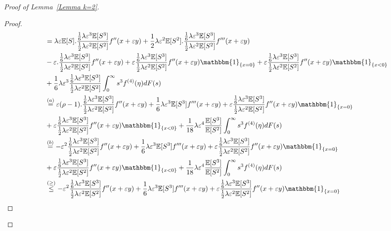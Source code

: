 \documentclass[10pt,a4paper]{amsart}
\begin{document}
\begin{proof}[Proof of Lemma~\ref{Lemma k=2}]
\begin{proof}
\begin{align*}
  &=\lambda \varepsilon \mathbb E[S].\frac{\frac{1}{6}\lambda \varepsilon^3 \mathbb E[S^3]}{\frac{1}{2}\lambda \varepsilon^2 \mathbb E[S^2]}f''(x+\varepsilon y)+\frac{1}{2}\lambda \varepsilon^2 \mathbb E[S^2].\frac{\frac{1}{6}\lambda \varepsilon^3 \mathbb E[S^3]}{\frac{1}{2}\lambda \varepsilon^2 \mathbb E[S^2]}f'''(x+\varepsilon y)\\
    &-\varepsilon.\frac{\frac{1}{6}\lambda \varepsilon^3 \mathbb E[S^3]}{\frac{1}{2}\lambda \varepsilon^2 \mathbb E[S^2]} f''(x+\varepsilon y)+\varepsilon \frac{\frac{1}{6}\lambda \varepsilon^3 \mathbb E[S^3]}{\frac{1}{2}\lambda \varepsilon^2 \mathbb E[S^2]}f''(x+\varepsilon y)\mathbbm{1}_{\{x=0\}}+\varepsilon \frac{\frac{1}{6}\lambda \varepsilon^3 \mathbb E[S^3]}{\frac{1}{2}\lambda \varepsilon^2 \mathbb E[S^2]}f''(x+\varepsilon y)\mathbbm{1}_{\{x<0\}}\\
    &+\frac{1}{6} \lambda \varepsilon^3 \frac{\frac{1}{6}\lambda \varepsilon^3 \mathbb E[S^3]}{\frac{1}{2}\lambda \varepsilon^2 \mathbb E[S^2]} \int_0^\infty s^3 f^{(4)}(\eta )dF(s)\\
    &\stackrel{(a)}{=}\varepsilon(\rho-1 ).\frac{\frac{1}{6}\lambda \varepsilon^3 \mathbb E[S^3]}{\frac{1}{2}\lambda \varepsilon^2 \mathbb E[S^2]}f''(x+\varepsilon y)+\frac{1}{6}\lambda \varepsilon^3 \mathbb E[S^3]f'''(x+\varepsilon y)+\varepsilon \frac{\frac{1}{6}\lambda \varepsilon^3 \mathbb E[S^3]}{\frac{1}{2}\lambda \varepsilon^2 \mathbb E[S^2]}  f''(x+\varepsilon y)\mathbbm{1}_{\{x=0\}}\\
    &+\varepsilon \frac{\frac{1}{6}\lambda \varepsilon^3 \mathbb E[S^3]}{\frac{1}{2}\lambda \varepsilon^2 \mathbb E[S^2]}  f''(x+\varepsilon y)\mathbbm{1}_{\{x<0\}}+\frac{1}{18} \lambda \varepsilon^4 \frac{\mathbb E[S^3]}{\mathbb E[S^2]}\int_0^\infty s^3 f^{(4)}(\eta )dF(s)\\
    &\stackrel{(b)}{=}-\varepsilon^2\frac{\frac{1}{6}\lambda \varepsilon^3 \mathbb E[S^3]}{\frac{1}{2}\lambda \varepsilon^2 \mathbb E[S^2]}f''(x+\varepsilon y)+\frac{1}{6}\lambda \varepsilon^3 \mathbb E[S^3]f'''(x+\varepsilon y)+\varepsilon \frac{\frac{1}{6}\lambda \varepsilon^3 \mathbb E[S^3]}{\frac{1}{2}\lambda \varepsilon^2 \mathbb E[S^2]} f''(x+\varepsilon y)\mathbbm{1}_{\{x=0\}}\\
    &+\varepsilon \frac{\frac{1}{6}\lambda \varepsilon^3 \mathbb E[S^3]}{\frac{1}{2}\lambda \varepsilon^2 \mathbb E[S^2]} f''(x+\varepsilon y)\mathbbm{1}_{\{x<0\}}+\frac{1}{18} \lambda \varepsilon^4 \frac{\mathbb E[S^3]}{\mathbb E[S^2]}\int_0^\infty s^3 f^{(4)}(\eta )dF(s)\\
   &\stackrel{(\geq)} {\leq} -\varepsilon^2\frac{\frac{1}{6}\lambda \varepsilon^3 \mathbb E[S^3]}{\frac{1}{2}\lambda \varepsilon^2 \mathbb E[S^2]}f''(x+\varepsilon y)+\frac{1}{6}\lambda \varepsilon^3 \mathbb E[S^3]f'''(x+\varepsilon y)+\varepsilon \frac{\frac{1}{6}\lambda \varepsilon^3 \mathbb E[S^3]}{\frac{1}{2}\lambda \varepsilon^2 \mathbb E[S^2]} f''(x+\varepsilon y)\mathbbm{1}_{\{x=0\}}\\

\end{align*}
\end{proof}
\end{proof}
\end{document}
